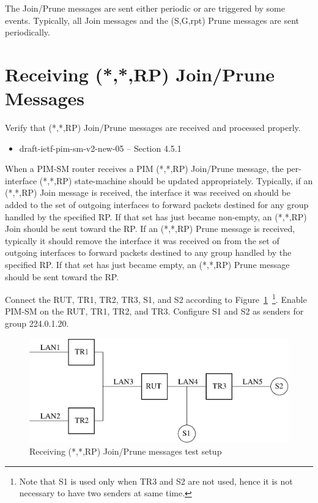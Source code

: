 \documentclass[11pt]{report}
\begin{document}
The Join/Prune messages are sent either periodic or are triggered by
some events. Typically, all Join messages and the (S,G,rpt) Prune
messages are sent periodically.

\newpage
\section{Receiving (*,*,RP) Join/Prune Messages}

Verify that (*,*,RP) Join/Prune messages are received and processed
properly.

\begin{itemize}
  \item draft-ietf-pim-sm-v2-new-05 -- Section 4.5.1
\end{itemize}

When a PIM-SM router receives a PIM (*,*,RP) Join/Prune message, the
per-interface (*,*,RP) state-machine should be updated appropriately.
Typically, if an (*,*,RP) Join message is received, the interface it was
received on should be added to the set of outgoing interfaces to
forward packets destined for any group handled by the specified RP.
If that set has just became non-empty, an (*,*,RP) Join should be sent
toward the RP.
If an (*,*,RP) Prune message is received, typically it should remove
the interface it was received on from the set of outgoing interfaces
to forward packets destined to any group handled by the specified RP. If
that set has just became empty, an (*,*,RP) Prune message should be
sent toward the RP.

Connect the RUT, TR1, TR2, TR3, S1, and S2 according to
Figure~\ref{fig:receiving_rp_join_prune_messages}~\footnote{Note that S1 is
used only when TR3 and S2 are not used, hence it is not necessary to have two
senders at same time.}.
Enable PIM-SM on the RUT, TR1, TR2, and TR3.
Configure S1 and S2 as senders for group 224.0.1.20.

\begin{figure}[htbp]
  \begin{center}
    \includegraphics[scale=0.8]{figs/pim_test_4_1_receiving_rp_join_prune_messages}
    \caption{Receiving (*,*,RP) Join/Prune messages test setup}
    \label{fig:receiving_rp_join_prune_messages}
  \end{center}
\end{figure}
\end{document}
